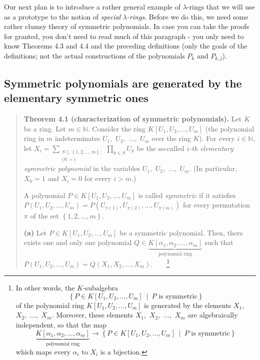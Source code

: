 \documentclass[numbers=enddot,12pt,final,onecolumn,notitlepage]{scrartcl}%
\begin{document}
Our next plan is to introduce a rather general example of $\lambda$-rings that
we will use as a prototype to the notion of \textit{special }$\lambda
$\textit{-rings}. Before we do this, we need some rather clumsy theory of
symmetric polynomials. In case you can take the proofs for granted, you don't
need to read much of this paragraph - you only need to know Theorems 4.3 and
4.4 and the preceding definitions (only the goals of the definitions; not the
actual constructions of the polynomials $P_{k}$ and $P_{k,j}$).

\subsection{Symmetric polynomials are generated by the elementary symmetric
ones}

\begin{quote}
\textbf{Theorem 4.1 (characterization of symmetric polynomials).} Let $K$ be a
ring. Let $m\in\mathbb{N}$. Consider the ring $K\left[  U_{1},U_{2}%
,...,U_{m}\right]  $ (the polynomial ring in $m$ indeterminates $U_{1},$
$U_{2},$ $...,$ $U_{m}$ over the ring $K$). For every $i\in\mathbb{N}$, let
$X_{i}=\sum\limits_{\substack{S\subseteq\left\{  1,2,...,m\right\}
;\\\left\vert S\right\vert =i}}\prod\limits_{k\in S}U_{k}$ be the so-called
$i$\textit{-th elementary symmetric polynomial} in the variables $U_{1},$
$U_{2},$ $...,$ $U_{m}$. (In particular, $X_{0}=1$ and $X_{i}=0$ for every
$i>m$.)

A polynomial $P\in K\left[  U_{1},U_{2},...,U_{m}\right]  $ is called
\textit{symmetric} if it satisfies $P\left(  U_{1},U_{2},...,U_{m}\right)
=P\left(  U_{\pi\left(  1\right)  },U_{\pi\left(  2\right)  },...,U_{\pi
\left(  m\right)  }\right)  $ for every permutation $\pi$ of the set $\left\{
1,2,...,m\right\}  $.

\textbf{(a)} Let $P\in K\left[  U_{1},U_{2},...,U_{m}\right]  $ be a symmetric
polynomial. Then, there exists one and only one polynomial $Q\in
\underbrace{K\left[  \alpha_{1},\alpha_{2},...,\alpha_{m}\right]
}_{\text{polynomial ring}}$ such that $P\left(  U_{1},U_{2},...,U_{m}\right)
=Q\left(  X_{1},X_{2},...,X_{m}\right)  $.\ \ \ \ \footnote{In other words,
the $K$-subalgebra%
\[
\left\{  P\in K\left[  U_{1},U_{2},...,U_{m}\right]  \ \mid\ P\text{ is
symmetric}\right\}
\]
of the polynomial ring $K\left[  U_{1},U_{2},...,U_{m}\right]  $ is generated
by the elements $X_{1},$ $X_{2},$ $...,$ $X_{m}$. Moreover, these elements
$X_{1},$ $X_{2},$ $...,$ $X_{m}$ are algebraically independent, so that the
map%
\[
\underbrace{K\left[  \alpha_{1},\alpha_{2},...,\alpha_{m}\right]
}_{\text{polynomial ring}}\rightarrow\left\{  P\in K\left[  U_{1}%
,U_{2},...,U_{m}\right]  \ \mid\ P\text{ is symmetric}\right\}
\]
which maps every $\alpha_{i}$ to $X_{i}$ is a bijection.}


\end{quote}
\end{document}

